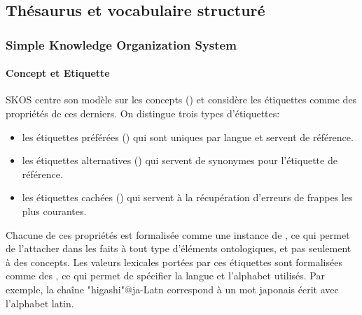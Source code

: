 \subsection{Thésaurus et vocabulaire structuré}\label{sec:thesaurus}
\subsubsection{Simple Knowledge Organization System}\label{sec:skos}

\paragraph{Concept et Etiquette}
SKOS centre son modèle sur les concepts () et considère les étiquettes comme des propriétés de ces derniers. 
On distingue trois types d'étiquettes: 
\begin{itemize} 
	\item les étiquettes préférées () qui sont uniques par langue et servent de référence.
	\item les étiquettes alternatives () qui servent de synonymes pour l'étiquette de référence. 
	\item les étiquettes cachées () qui servent à la récupération d'erreurs de frappes les plus courantes. 
\end{itemize}
Chacune de ces propriétés est formalisée comme une instance de , ce qui permet de l'attacher dans les faits à tout type d'éléments ontologiques, et pas seulement à des concepts. 
Les valeurs lexicales portées par ces étiquettes sont formalisées comme des , ce qui permet de spécifier la langue et l'alphabet utilisés. 
Par exemple, la chaîne "higashi"@ja-Latn correspond à un mot japonais écrit avec l'alphabet latin.

